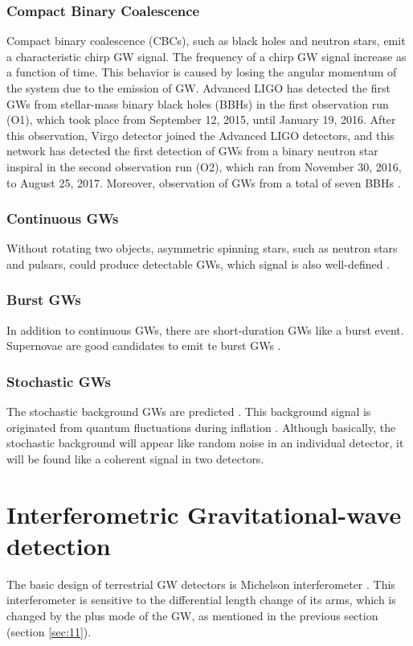 \subsubsection{Compact Binary Coalescence}
Compact binary coalescence (CBCs), such as black holes and neutron stars, emit a characteristic chirp GW signal. The frequency of a chirp GW signal increase as a function of time. This behavior is caused by losing the angular momentum of the system due to the emission of GW. 
Advanced LIGO has detected the first GWs from stellar-mass binary black holes (BBHs) in the first observation run (O1), which took place from September 12, 2015, until January 19, 2016. After this observation, Virgo detector joined the Advanced LIGO detectors, and this network has detected the first detection of GWs from a binary neutron star inspiral in the second observation run (O2), which ran from November 30, 2016, to August 25, 2017. Moreover, observation of GWs from a total of seven BBHs \cite{abbott2019gwtc}. 

\subsubsection{Continuous GWs}
Without rotating two objects, asymmetric spinning stars, such as neutron stars and pulsars, could produce detectable GWs, which signal is also well-defined \cite{leaci2012searching,hereld1984search}.

\subsubsection{Burst GWs}
In addition to continuous GWs, there are short-duration GWs like a burst event. Supernovae are good candidates to emit te burst GWs \cite{ott2004gravitational}.

\subsubsection{Stochastic GWs}
The stochastic background GWs are predicted \cite{starobinskii1979spectrum,Christensen_2018}. This background signal is originated from quantum fluctuations during inflation \cite{PhysRevD.23.347}. Although basically, the stochastic background will appear like random noise in an individual detector, it will be found like a coherent signal in two detectors. 

\section{Interferometric Gravitational-wave detection} \label{sec:12}
The basic design of terrestrial GW detectors is Michelson interferometer \cite{weiss1972electronically}. This interferometer is sensitive to the differential length change of its arms, which is changed by the plus mode of the GW, as mentioned in the previous section (section \ref{sec:11}).

